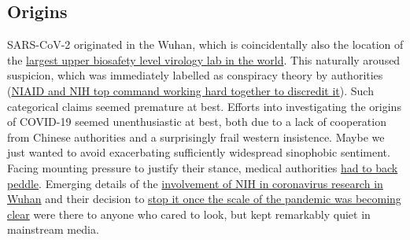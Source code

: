 \documentclass[11pt,a4paper]{article}
\begin{document}
\subsection*{Origins}

SARS-CoV-2 originated in the Wuhan, which is coincidentally also the location of the \href{https://theconversation.com/fifty-nine-labs-around-world-handle-the-deadliest-pathogens-only-a-quarter-score-high-on-safety-161777}{largest upper biosafety level virology lab in the world}. This naturally aroused suspicion, which was immediately labelled as conspiracy theory by authorities (\href{https://nypost.com/2022/01/11/fauci-called-wuhan-lab-leak-theory-shiny-object-in-april-2020-email/}{NIAID and NIH top command working hard together to discredit it}). Such categorical claims seemed premature at best. Efforts into investigating the origins of COVID-19 seemed unenthusiastic at best, both due to a lack of cooperation from Chinese authorities and a surprisingly frail western insistence. Maybe we just wanted to avoid exacerbating sufficiently widespread sinophobic sentiment. Facing mounting pressure to justify their stance, medical authorities \href{https://www.theguardian.com/world/2021/jul/16/who-chief-says-push-to-discount-lab-leak-theory-was-premature}{had to back peddle}. Emerging details of the \href{https://www.vanityfair.com/news/2021/10/nih-admits-funding-risky-virus-research-in-wuhan}{involvement of NIH in coronavirus research in Wuhan} and their decision to \href{https://www.the-scientist.com/news-opinion/nih-cancels-funding-for-bat-coronavirus-research-project-67486}{stop it once the scale of the pandemic was becoming clear} were there to anyone who cared to look, but kept remarkably quiet in mainstream media. 
\end{document}
